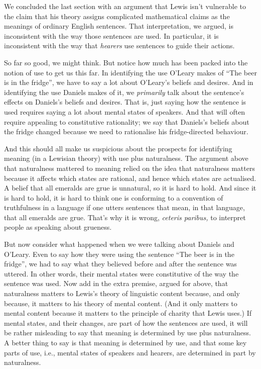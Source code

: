 We concluded the last section with an argument that Lewis isn't vulnerable to the claim that his theory assigns complicated mathematical claims as the meanings of ordinary English sentences. That interpretation, we argued, is inconsistent with the way those sentences are used. In particular, it is inconsistent with the way that \textit{hearers} use sentences to guide their actions.

So far so good, we might think. But notice how much has been packed into the notion of use to get us this far. In identifying the use O'Leary makes of ``The beer is in the fridge'', we have to say a lot about O'Leary's beliefs and desires. And in identifying the use Daniels makes of it, we \textit{primarily} talk about the sentence's effects on Daniels's beliefs and desires. That is, just saying how the sentence is used requires saying a lot about mental states of speakers. And that will often require appealing to constitutive rationality; we say that Daniels's beliefs about the fridge changed because we need to rationalise his fridge-directed behaviour.

And this should all make us suspicious about the prospects for identifying meaning (in a Lewisian theory) with use plus naturalness. The argument above that naturalness mattered to meaning relied on the idea that naturalness matters because it affects which states are rational, and hence which states are actualised. A belief that all emeralds are grue is unnatural, so it is hard to hold. And since it is hard to hold, it is hard to think one is conforming to a convention of truthfulness in a language if one utters sentences that mean, in that language, that all emeralds are grue. That's why it is wrong, \textit{ceteris paribus,} to interpret people as speaking about grueness. 

But now consider what happened when we were talking about Daniels and O'Leary. Even to say how they were using the sentence ``The beer is in the fridge'', we had to say what they believed before and after the sentence was uttered. In other words, their mental states were constitutive of the way the sentence was used. Now add in the extra premise, argued for above, that naturalness matters to Lewis's theory of linguistic content because, and only because, it matters to his theory of mental content. (And it only matters to mental content because it matters to the principle of charity that Lewis uses.) If mental states, and their changes, are part of how the sentences are used, it will be rather misleading to say that meaning is determined by use plus naturalness. A better thing to say is that meaning is determined by use, and that some key parts of use, i.e., mental states of speakers and hearers, are determined in part by naturalness. 

